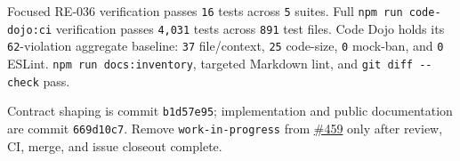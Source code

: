 Focused RE-036 verification passes \texttt{1\allowbreak{}6} tests across \texttt{5} suites. Full \texttt{n\allowbreak{}p\allowbreak{}m\allowbreak{} \allowbreak{}r\allowbreak{}u\allowbreak{}n\allowbreak{} \allowbreak{}c\allowbreak{}o\allowbreak{}d\allowbreak{}e\allowbreak{}-\allowbreak{}d\allowbreak{}o\allowbreak{}j\allowbreak{}o\allowbreak{}:\allowbreak{}c\allowbreak{}i} verification passes \texttt{4\allowbreak{},\allowbreak{}0\allowbreak{}3\allowbreak{}1} tests across \texttt{8\allowbreak{}9\allowbreak{}1} test files. Code Dojo holds its \texttt{6\allowbreak{}2}-violation aggregate baseline: \texttt{3\allowbreak{}7} file/context, \texttt{2\allowbreak{}5} code-size, \texttt{0} mock-ban, and \texttt{0} ESLint. \texttt{n\allowbreak{}p\allowbreak{}m\allowbreak{} \allowbreak{}r\allowbreak{}u\allowbreak{}n\allowbreak{} \allowbreak{}d\allowbreak{}o\allowbreak{}c\allowbreak{}s\allowbreak{}:\allowbreak{}i\allowbreak{}n\allowbreak{}v\allowbreak{}e\allowbreak{}n\allowbreak{}t\allowbreak{}o\allowbreak{}r\allowbreak{}y}, targeted Markdown lint, and \texttt{g\allowbreak{}i\allowbreak{}t\allowbreak{} \allowbreak{}d\allowbreak{}i\allowbreak{}f\allowbreak{}f\allowbreak{} \allowbreak{}-\allowbreak{}-\allowbreak{}c\allowbreak{}h\allowbreak{}e\allowbreak{}c\allowbreak{}k} pass.

Contract shaping is commit \texttt{b\allowbreak{}1\allowbreak{}d\allowbreak{}5\allowbreak{}7\allowbreak{}e\allowbreak{}9\allowbreak{}5}; implementation and public documentation are commit \texttt{6\allowbreak{}6\allowbreak{}9\allowbreak{}d\allowbreak{}1\allowbreak{}0\allowbreak{}c\allowbreak{}7}. Remove \texttt{w\allowbreak{}o\allowbreak{}r\allowbreak{}k\allowbreak{}-\allowbreak{}i\allowbreak{}n\allowbreak{}-\allowbreak{}p\allowbreak{}r\allowbreak{}o\allowbreak{}g\allowbreak{}r\allowbreak{}e\allowbreak{}s\allowbreak{}s} from \href{https://github.com/flyingrobots/bijou/issues/459}{\#459} only after review, CI, merge, and issue closeout complete.

